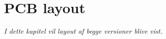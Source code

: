 \chapter{PCB layout}\label{kap:PCB}

\emph{I dette kapitel vil layout af begge versioner blive vist.}